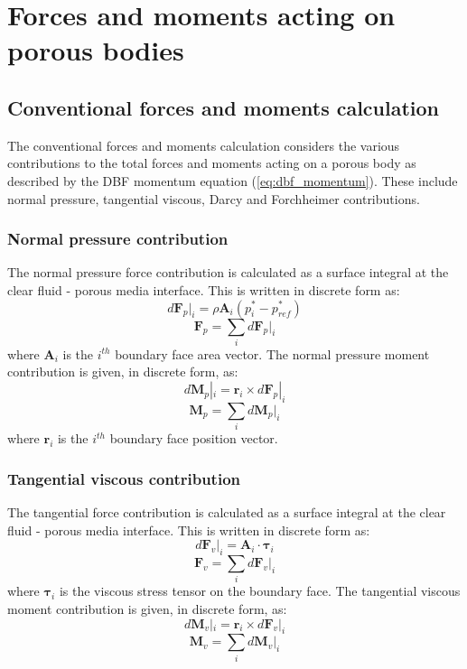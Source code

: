 \documentclass[a4paper,11pt]{report}
\begin{document}
\chapter{Forces and moments acting on porous bodies}
\section{Conventional forces and moments calculation}
The conventional forces and moments calculation considers the various contributions to the total forces and moments acting on a porous body as described by the DBF momentum equation (\ref{eq:dbf_momentum}). These include normal pressure, tangential viscous, Darcy and Forchheimer contributions.
\subsection{Normal pressure contribution}
The normal pressure force contribution is calculated as a surface integral at the clear fluid - porous media interface. This is written in discrete form as:
\begin{equation}
    d\mathbf{F}_p|_i = \rho\mathbf{A}_i(p_i^*-p_{ref}^*)
    \label{eq:dFpi}
\end{equation}
\begin{equation}
    \mathbf{F}_p = \sum_i d\mathbf{F}_p|_i
    \label{eq:Fp}
\end{equation}
where $\mathbf{A}_i$ is the $i^{th}$ boundary face area vector. The normal pressure moment contribution is given, in discrete form, as:
\begin{equation}
    d\mathbf{M}_p|_i = \mathbf{r}_i\times d\mathbf{F}_p|_i
    \label{eq:dMpi}
\end{equation}
\begin{equation}
    \mathbf{M}_p = \sum_i d\mathbf{M}_p|_i
    \label{eq:Mp}
\end{equation}
where $\mathbf{r}_i$ is the $i^{th}$ boundary face position vector.
\subsection{Tangential viscous contribution}
The tangential force contribution is calculated as a surface integral at the clear fluid - porous media interface. This is written in discrete form as:
\begin{equation}
    d\mathbf{F}_v|_i = \mathbf{A}_i\cdot \pmb{\tau}_i
    \label{eq:dFvi}
\end{equation}
\begin{equation}
    \mathbf{F}_v = \sum_i d\mathbf{F}_v|_i
    \label{eq:Fv}
\end{equation}
where $\pmb{\tau}_i$ is the viscous stress tensor on the boundary face. The tangential viscous moment contribution is given, in discrete form, as:
\begin{equation}
    d\mathbf{M}_v|_i = \mathbf{r}_i\times d\mathbf{F}_v|_i
    \label{eq:dMvi}
\end{equation}
\begin{equation}
    \mathbf{M}_v = \sum_i d\mathbf{M}_v|_i
    \label{eq:Mv}
\end{equation}
\end{document}
